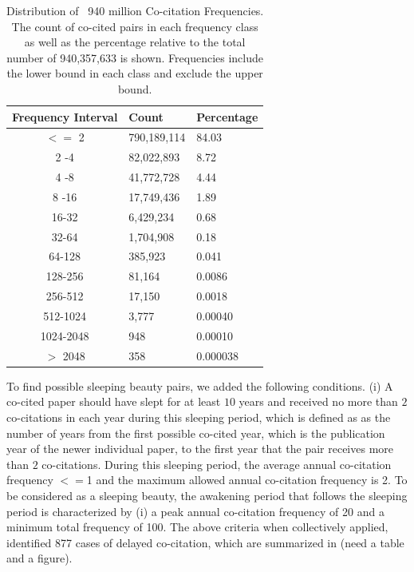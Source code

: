 \documentclass[utf8]{frontiersSCNS}
\begin{document}
\begin{table}[ht]
\caption{Distribution of ~940 million Co-citation Frequencies. The count of co-cited pairs in each frequency class as well as the percentage relative to the total number of 940,357,633 is shown. Frequencies include the lower bound in each class and exclude the upper bound.}%
\centering %
\begin{center}
\begin{tabular}{cll} 
Frequency Interval & Count & Percentage \\
\hline %
$<=$ 2 & 790,189,114 & 84.03 \\
2 -4 & 82,022,893 & 8.72 \\
4 -8 & 41,772,728 & 4.44 \\
8 -16 & 17,749,436 & 1.89 \\
16-32 & 6,429,234 & 0.68\\
32-64 & 1,704,908 & 0.18\\
64-128 & 385,923 & 0.041\\
128-256 & 81,164 & 0.0086\\ 
256-512 & 17,150 & 0.0018\\
512-1024 & 3,777 & 0.00040\\
1024-2048 & 948 & 0.00010\\ 
$> $ 2048 & 358 & 0.000038\\   
\hline 
\end{tabular}
\end{center}
\label{tab:table1} %
\end{table}


To find possible sleeping beauty pairs, we added the following conditions. (i)  A co-cited paper should have slept for at least $10$ years and received no more than $2$ co-citations in each year during this sleeping period, which is defined as as the number of years from the first possible co-cited year, which is the publication year of the newer individual paper, to the first year that the pair receives more than $2$ co-citations. During this sleeping period, the average annual co-citation frequency $<=$1 and the maximum allowed annual co-citation frequency is 2. To be considered as a sleeping beauty, the awakening period that follows the sleeping period is characterized by (i) a peak annual co-citation frequency of 20 and a minimum total frequency of 100. The above criteria when collectively applied, identified 877 cases of delayed co-citation, which are summarized in (need a table and a figure). 
\end{document}
